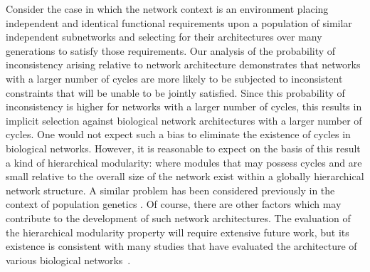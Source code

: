 Consider the case in which the network context is an environment placing independent and identical functional requirements upon a population of similar independent subnetworks and selecting for their architectures over many generations to satisfy those requirements. Our analysis of the probability of inconsistency arising relative to network architecture demonstrates that networks with a larger number of cycles are more likely to be subjected to inconsistent constraints that will be unable to be jointly satisfied. Since this probability of inconsistency is higher for networks with a larger number of cycles, this results in implicit selection against biological network architectures with a larger number of cycles. One would not expect such a bias to eliminate the existence of cycles in biological networks. However, it is reasonable to expect on the basis of this result a kind of hierarchical modularity: where modules that may possess cycles and are small relative to the overall size of the network exist within a globally hierarchical network structure. A similar problem has been considered previously in the context of population genetics \cite{EthanAkin389}. Of course, there are other factors which may contribute to the development of such network architectures. The evaluation of the hierarchical modularity property will require extensive future work, but its existence is consistent with many studies that have evaluated the architecture of various biological networks~\cite{Ravasz2002,Segre2005,Wagner2007,Erwin2009,Jothi2009,Bhardwaj2010,Chalancon2012,Colm}.


